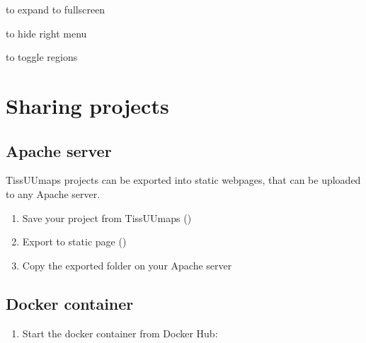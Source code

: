 \documentclass[letterpaper,10pt,english,openany,oneside]{sphinxmanual}
\begin{document}
\sphinxAtStartPar
{} \sphinxhyphen{} to expand to fullscreen

\sphinxAtStartPar
{} \sphinxhyphen{} to hide right menu

\sphinxAtStartPar
{} \sphinxhyphen{} to toggle regions

\sphinxstepscope


\chapter{Sharing projects}
\label{\detokenize{docs/sharing/index:sharing-projects}}\label{\detokenize{docs/sharing/index::doc}}
\sphinxstepscope


\section{Apache server}
\label{\detokenize{docs/sharing/apache:apache-server}}\label{\detokenize{docs/sharing/apache::doc}}
\sphinxAtStartPar
TissUUmaps projects can be exported into static webpages, that can be uploaded to any Apache server.
\begin{enumerate}
%
\item {} 
\sphinxAtStartPar
Save your project from TissUUmaps ()

\item {} 
\sphinxAtStartPar
Export to static page ()

\item {} 
\sphinxAtStartPar
Copy the exported folder on your Apache server

\end{enumerate}

\sphinxstepscope


\section{Docker container}
\label{\detokenize{docs/sharing/docker:docker-container}}\label{\detokenize{docs/sharing/docker::doc}}\begin{enumerate}
%
\item {} 
\sphinxAtStartPar
Start the docker container  from Docker Hub:

\end{enumerate}
\end{document}
